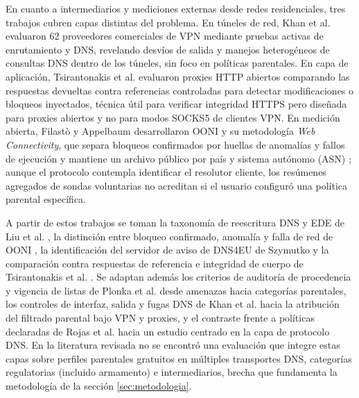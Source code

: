 \documentclass[10pt,a4paper]{article}
\begin{document}
En cuanto a intermediarios y mediciones externas desde redes residenciales, tres trabajos cubren capas distintas del problema. En túneles de red, Khan et al. \cite{khan2018vpn} evaluaron 62 proveedores comerciales de VPN mediante pruebas activas de enrutamiento y DNS, revelando desvíos de salida y manejos heterogéneos de consultas DNS dentro de los túneles, sin foco en políticas parentales. En capa de aplicación, Tsirantonakis et al. \cite{tsirantonakis2018proxy} evaluaron proxies HTTP abiertos comparando las respuestas devueltas contra referencias controladas para detectar modificaciones o bloqueos inyectados, técnica útil para verificar integridad HTTPS pero diseñada para proxies abiertos y no para modos SOCKS5 de clientes VPN. En medición abierta, Filastò y Appelbaum \cite{ooni2012} desarrollaron OONI y su metodología \emph{Web Connectivity}, que separa bloqueos confirmados por huellas de anomalías y fallos de ejecución y mantiene un archivo público por país y sistema autónomo (ASN) \cite{ooni}; aunque el protocolo contempla identificar el resolutor cliente, los resúmenes agregados de sondas voluntarias no acreditan si el usuario configuró una política parental específica.

A partir de estos trabajos se toman la taxonomía de reescritura DNS y EDE de Liu et al. \cite{liu2024}, la distinción entre bloqueo confirmado, anomalía y falla de red de OONI \cite{ooni2012,ooni}, la identificación del servidor de aviso de DNS4EU de Szymutko \cite{szymutko2026} y la comparación contra respuestas de referencia e integridad de cuerpo de Tsirantonakis et al. \cite{tsirantonakis2018proxy}. Se adaptan además los criterios de auditoría de procedencia y vigencia de listas de Plonka et al. \cite{plonka2025} desde amenazas hacia categorías parentales, los controles de interfaz, salida y fugas DNS de Khan et al. \cite{khan2018vpn} hacia la atribución del filtrado parental bajo VPN y proxies, y el contraste frente a políticas declaradas de Rojas et al. \cite{rojas2025,rojas2025ieee} hacia un estudio centrado en la capa de protocolo DNS. En la literatura revisada no se encontró una evaluación que integre estas capas sobre perfiles parentales gratuitos en múltiples transportes DNS, categorías regulatorias (incluido armamento) e intermediarios, brecha que fundamenta la metodología de la sección \ref{sec:metodologia}.
\end{document}
